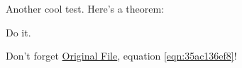 \documentclass[reqno]{amsart} 
\begin{document}
Another cool test.  Here's a theorem:
\begin{theorem}\label{theorem:35ac204d35}
  Do it.
\end{theorem}

Don't forget \href{test.pdf}{Original File}, equation \eqref{eqn:35ac136ef8}!


{} 
\end{document}
